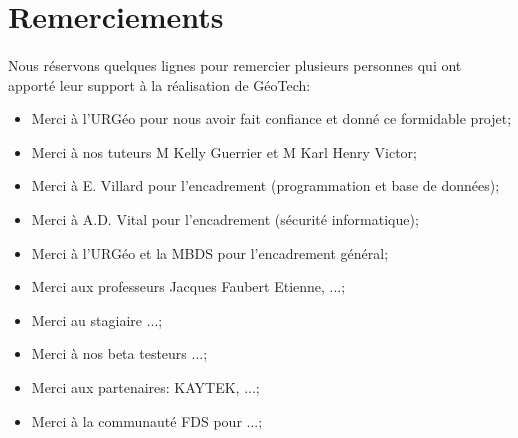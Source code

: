 \section{Remerciements}
\paragraph{}
Nous réservons quelques lignes pour remercier plusieurs personnes qui ont apporté leur support à la réalisation de GéoTech:\par



\begin{itemize}
    \item Merci à l'URGéo pour nous avoir fait confiance et donné ce formidable projet;\par
    \item Merci à nos tuteurs M Kelly Guerrier et M Karl Henry Victor;\par
    \item   Merci à  E. Villard pour l'encadrement (programmation et base de données);\par
    \item   Merci à A.D. Vital pour l'encadrement (sécurité informatique);\par
    \item   Merci à l'URGéo et la MBDS pour l'encadrement général;\par
    \item   Merci aux professeurs Jacques Faubert Etienne, ...;\par
    \item   Merci au stagiaire ...;\par
    \item   Merci à nos beta testeurs ...;\par
    \item   Merci aux partenaires: KAYTEK, ...;\par
    \item  Merci à la communauté FDS pour ...;\par
\end{itemize}
